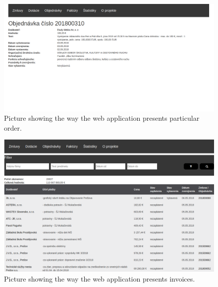 \documentclass[thesis=B,english]{FITthesis}[2012/06/26]
\begin{document}
{\begin{figure}[H]
  \begin{center}
  \includegraphics[scale=0.30]{pictures/orderDetail.png}
  \caption{Picture showing the way the web application presents particular order.}
    \label{fig:webapp-order-detail}
  \end{center}
\end{figure}

\begin{figure}[H]
  \begin{center}
  \includegraphics[scale=0.30]{pictures/invoices.png}
  \caption{Picture showing the way the web application presents invoices.}
    \label{fig:webapp-invoices}
  \end{center}
\end{figure}

}
\end{document}

